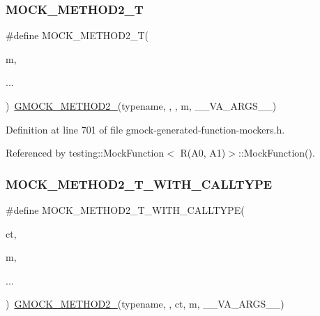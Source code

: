 \subsubsection{\texorpdfstring{M\+O\+C\+K\+\_\+\+M\+E\+T\+H\+O\+D2\+\_\+T}{MOCK\_METHOD2\_T}}
{\footnotesize\ttfamily \#define M\+O\+C\+K\+\_\+\+M\+E\+T\+H\+O\+D2\+\_\+T(\begin{DoxyParamCaption}\item[{}]{m,  }\item[{}]{... }\end{DoxyParamCaption})~\hyperlink{gmock-generated-function-mockers_8h_a885295ca6bebb15efb3fc786218c5d47}{G\+M\+O\+C\+K\+\_\+\+M\+E\+T\+H\+O\+D2\+\_\+}(typename, , , m, \+\_\+\+\_\+\+V\+A\+\_\+\+A\+R\+G\+S\+\_\+\+\_\+)}



Definition at line 701 of file gmock-\/generated-\/function-\/mockers.\+h.



Referenced by testing\+::\+Mock\+Function$<$ R(\+A0, A1)$>$\+::\+Mock\+Function().

\mbox{\label{gmock-generated-function-mockers_8h_a18e4e8da0bdf27bde5ffca30587ff074}} 
\subsubsection{\texorpdfstring{M\+O\+C\+K\+\_\+\+M\+E\+T\+H\+O\+D2\+\_\+\+T\+\_\+\+W\+I\+T\+H\+\_\+\+C\+A\+L\+L\+T\+Y\+PE}{MOCK\_METHOD2\_T\_WITH\_CALLTYPE}}
{\footnotesize\ttfamily \#define M\+O\+C\+K\+\_\+\+M\+E\+T\+H\+O\+D2\+\_\+\+T\+\_\+\+W\+I\+T\+H\+\_\+\+C\+A\+L\+L\+T\+Y\+PE(\begin{DoxyParamCaption}\item[{}]{ct,  }\item[{}]{m,  }\item[{}]{... }\end{DoxyParamCaption})~\hyperlink{gmock-generated-function-mockers_8h_a885295ca6bebb15efb3fc786218c5d47}{G\+M\+O\+C\+K\+\_\+\+M\+E\+T\+H\+O\+D2\+\_\+}(typename, , ct, m, \+\_\+\+\_\+\+V\+A\+\_\+\+A\+R\+G\+S\+\_\+\+\_\+)}



